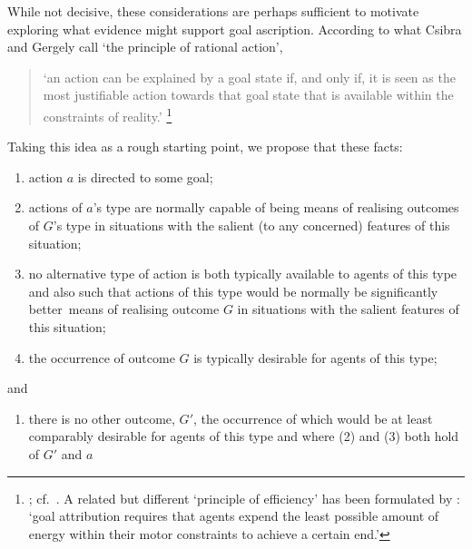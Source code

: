 \documentclass[12pt,\papersize]{extarticle}
\begin{document}
While not decisive,
these considerations are perhaps sufficient to motivate 
exploring what evidence might support goal ascription.
According to 
what Csibra and Gergely call `the principle of rational action',
%
\begin{quote}
`an action can be explained by a goal state if, and only if, it is seen as the most justifiable action towards that goal state that is available within the constraints of reality.'%
\footnote{
\citet[p.\ 255]{Csibra:1998cx}; cf.\ \citet{Csibra:2003jv}.
A related but different `principle of efficiency' has been formulated by \citet[p.\ 1061]{Southgate:2008el}:
`goal attribution requires that agents expend the least possible amount of energy within their motor constraints to achieve a certain end.'
}
\end{quote}
%
Taking this idea as a rough starting point,
we propose that
these facts:
%
\begin{enumerate}
%
\item action $a$ is directed to some goal;
%
\item actions of $a$'s type are normally capable of being means of realising outcomes of $G$'s type in situations with the salient (to any concerned) features of this situation;
% 
\item no alternative type of action is both 
typically available to agents of this type 
and also 
such that actions of this type would be normally be significantly better\footnotemark \ means of realising outcome $G$ in situations with the salient features of this situation;
%
\item the occurrence of outcome $G$ is typically desirable for agents of this type;
%
\end{enumerate}
%
and
%
\begin{enumerate}[resume]
\item there is no other outcome, $G'$, 
the occurrence of which would be at least comparably desirable for agents of this type 
and where (2) and (3) both hold of $G'$ and $a$
%
\end{enumerate}
\end{document}
